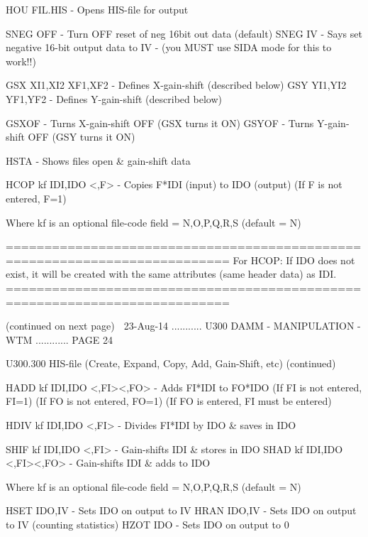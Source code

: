    HOU  FIL.HIS               - Opens HIS-file for output
 
   SNEG OFF                   - Turn OFF reset of neg 16bit out data (default)
   SNEG IV                    - Says set negative 16-bit output data to IV
                              - (you MUST use SIDA mode for this to work!!)
 
   GSX  XI1,XI2 XF1,XF2       - Defines   X-gain-shift (described below)
   GSY  YI1,YI2 YF1,YF2       - Defines   Y-gain-shift (described below)
 
   GSXOF                      - Turns X-gain-shift OFF (GSX turns it ON)
   GSYOF                      - Turns Y-gain-shift OFF (GSY turns it ON)
 
   HSTA                       - Shows files open & gain-shift data
 
   HCOP kf IDI,IDO <,F>       - Copies F*IDI (input) to IDO (output)
                                (If F is not entered, F=1)
 
   Where kf is an optional file-code field = N,O,P,Q,R,S (default = N)
 
   ===========================================================================
   For HCOP: If IDO does not exist, it will be created with the same
   attributes (same header data) as IDI.
   ===========================================================================
 
                            (continued on next page)
    
   23-Aug-14 ........... U300  DAMM - MANIPULATION - WTM ............ PAGE  24
 
 
 
   U300.300  HIS-file (Create, Expand, Copy, Add, Gain-Shift, etc) (continued)
 
   HADD kf IDI,IDO <,FI><,FO> - Adds FI*IDI to FO*IDO
                                (If FI is not entered, FI=1)
                                (If FO is not entered, FO=1)
                                (If FO is entered, FI must be entered)
 
   HDIV kf IDI,IDO <,FI>      - Divides FI*IDI by IDO & saves in IDO
 
   SHIF kf IDI,IDO <,FI>      - Gain-shifts IDI & stores in IDO
   SHAD kf IDI,IDO <,FI><,FO> - Gain-shifts IDI & adds   to IDO
 
   Where kf is an optional file-code field = N,O,P,Q,R,S (default = N)
 
   HSET IDO,IV                - Sets IDO on output to IV
   HRAN IDO,IV                - Sets IDO on output to IV (counting statistics)
   HZOT IDO                   - Sets IDO on output to 0
 

